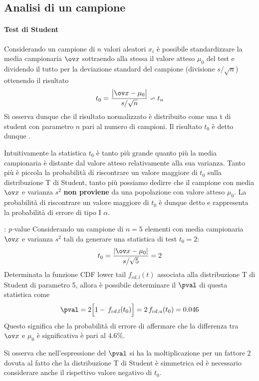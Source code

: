 	\subsection{Analisi di un campione}  \label{sec:stat:teststudent}
		\paragraph{Test di Student} Considerando un campione di $n$ valori aleatori $x_i$ è possibile standardizzare la media campionaria $\ov x$ sottraendo alla stessa il valore atteso $\mu_0$ del test e dividendo il tutto per la deviazione standard del campione (divisione $s/\sqrt n$) ottenendo il risultato
		\[ t_0 = \frac{\big|\ov x- \mu_0\big|}{s/\sqrt n} \backsim t_n \]
		Si osserva dunque che il risultato normalizzato è distribuito come una t di student con parametro $n$ pari al numero di campioni. Il risultato $t_0$ è detto dunque .
		
		Intuitivamente la statistica $t_0$ è tanto più grande quanto più la media campionaria è distante dal valore atteso relativamente alla sua varianza. Tanto più è piccola la probabilità di riscontrare un valore maggiore di $t_0$ sulla distribuzione T di Student, tanto più possiamo dedirre che il campione con media $\ov x$ e varianza $s^2$ \textbf{non proviene} da una popolazione con valore atteso $\mu_0$. La probabilità di riscontrare un valore maggiore di $t_0$ è dunque detto  e rappresenta la probabilità di errore di tipo I $\alpha$.
		
		\begin{esempio}{: \textit{p-}value}
			Considerando un campione di $n=5$ elementi con media campionaria $\ov x$ e varianza $s^2$ tali da generare una statistica di test $t_0=2$:
			\[ t_0 = \frac{|\ov x - \mu_0|}{s/\sqrt 5} = 2 \]
			Determinata la funzione CDF lower tail $f_{cd,l}(t)$ associata alla distribuzione T di Student di parametro 5, allora è possibile determinare il $\pval$ di questa statistica come
			\[ \pval = 2\Big[1- \, f_{cd,l}(t_0) \Big] = 2\, f_{cd,u}(t_0) = 0.046 \]
			Questo significa che la probabilità di errore di affermare che la differenza tra $\ov x$ e $\mu_0$ è significativa è pari al $4.6\%$.
			
			\vspace{3mm}
			Si osserva che nell'espressione del $\pval$ si ha la moltiplicazione per un fattore 2 dovuta al fatto che la distribuzione T di Student è simmetrica ed è necessario considerare anche il rispettivo valore negativo di $t_0$.
		\end{esempio}
		
